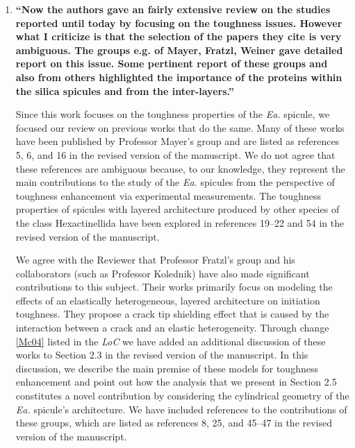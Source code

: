 \documentclass[11pt,letterpaper]{report}
\makeatletter
\newcommand{\EA}{\textit{Ea.\@}\xspace}
\makeatother
\begin{document}
\begin{enumerate}[label=\textit{3.\arabic*},wide, labelwidth=!, labelindent=0pt]
\item \label{r3c1} {\bf ``Now the authors gave an fairly extensive review on the studies reported until today by focusing on the toughness issues. However what I criticize is that the selection of the papers they cite is very ambiguous. The groups e.g. of Mayer, Fratzl, Weiner gave detailed report on this issue. Some pertinent report of these groups and also from others highlighted the importance of the proteins within the silica spicules and from the inter-layers.''}

Since this work focuses on the toughness properties of the \EA spicule, we focused our review on previous works that do the same. Many of these works have been published by Professor Mayer's group and are listed as references 5, 6, and 16 in the revised version of the manuscript. We do not agree that these references are ambiguous because, to our knowledge, they represent the main contributions to the study of the \EA spicules from the perspective of toughness enhancement via experimental measurements. The toughness properties of spicules with layered architecture produced by other species of the class Hexactinellida have been explored in references 19--22 and 54 in the revised version of the manuscript.

We agree with the Reviewer that Professor Fratzl's group and his collaborators (such as Professor Kolednik) have also made significant contributions to this subject. Their works primarily focus on modeling the effects of an elastically heterogeneous, layered architecture on initiation toughness. They propose a crack tip shielding effect that is caused by the interaction between a crack and an elastic heterogeneity. Through change \ref{Mc04} listed in the \textit{LoC} we have added an additional discussion of these works to Section 2.3 in the revised version of the manuscript. In this discussion, we describe the main premise of these models for toughness enhancement and point out how the analysis that we present in Section 2.5 constitutes a novel contribution by considering the cylindrical geometry of the \EA spicule's architecture. We have included references to the contributions of these groups, which are listed as references 8, 25, and 45--47 in the revised version of the manuscript.


\end{enumerate}
\end{document}
